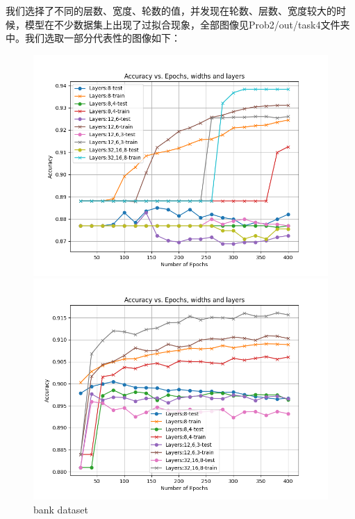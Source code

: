 \documentclass[8pt]{article}
\begin{document}
我们选择了不同的层数、宽度、轮数的值，并发现在轮数、层数、宽度较大的时候，模型在不少数据集上出现了过拟合现象，全部图像见Prob2/out/task4文件夹中。我们选取一部分代表性的图像如下：

\begin{figure}[H]
    \centering
    \begin{minipage}{0.32\textwidth}
        \centering
        \includegraphics[width=\textwidth]{../Prob2/out/task4/bank/AccVsLayer_maxe400_layer_1031_175606.png}
        \caption{bank dataset}
        \label{fig:AccVsLayer_maxe400_layer_1031_175606 on bank dataset}
    \end{minipage}
    \begin{minipage}{0.32\textwidth}
        \centering
        \includegraphics[width=\textwidth]{../Prob2/out/task4/full_bank/AccVsLayer_maxe400_layer_1031_175715.png}

\end{minipage}
\end{figure}
\end{document}
